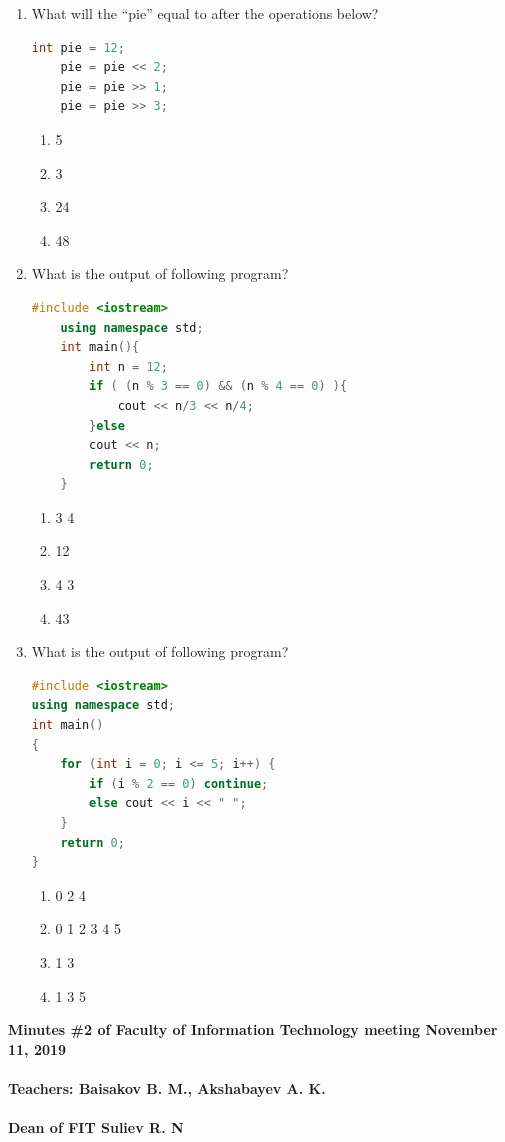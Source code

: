 \documentclass[10pt]{article}
\begin{document}
\begin{enumerate}
\item What will the “pie” equal to after the operations below?
\begin{lstlisting}[language=C++]
    int pie = 12;
    pie = pie << 2;
    pie = pie >> 1;
    pie = pie >> 3;
\end{lstlisting}
\begin{multicols}{4}
\begin{enumerate}
    \item 5
    \item 3
    \item 24
    \item 48 
\end{enumerate}
\end{multicols}







\item What is the output of following program?
\begin{lstlisting}[language=C++]
    #include <iostream>
    using namespace std;
    int main(){
        int n = 12;
        if ( (n % 3 == 0) && (n % 4 == 0) ){
            cout << n/3 << n/4;
        }else 
        cout << n;
        return 0;
    }

\end{lstlisting}
\begin{multicols}{4}
\begin{enumerate}
    \item 3 4
    \item 12
    \item 4 3
    \item 43
\end{enumerate}
\end{multicols}







\item What is the output of following program?
\begin{lstlisting}[language=C++]
#include <iostream>
using namespace std;
int main()
{
    for (int i = 0; i <= 5; i++) {
        if (i % 2 == 0) continue;
        else cout << i << " ";
   	}
    return 0;
}
\end{lstlisting}
\begin{multicols}{4}
\begin{enumerate}
    \item 0 2 4
    \item 0 1 2 3 4 5
    \item 1 3
    \item 1 3 5
\end{enumerate}
\end{multicols}




\end{enumerate}
\textbf{
Minutes \#2 of Faculty of Information Technology meeting November 11, 2019 \\\\
Teachers: Baisakov B. M., Akshabayev A. K. \\\\ 
Dean of FIT Suliev R. N \\\\
}
\end{document}
